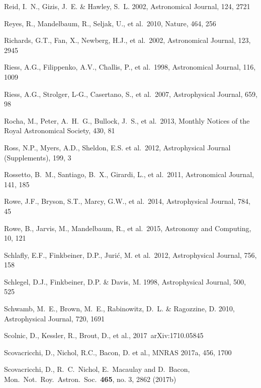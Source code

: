 \documentclass[twocolumn]{aastex61}
\begin{document}
\begin{thebibliography}{}
 Reid, I.~N., Gizis, J.~E. \& Hawley, S.~L. 2002,  Astronomical Journal, 124, 2721

 Reyes, R., Mandelbaum, R., Seljak, U., et al.~2010, Nature, 464, 256

 Richards, G.T., Fan, X., Newberg, H.J., et al.~2002, Astronomical Journal, 123, 2945

 Riess, A.G., Filippenko, A.V., Challis, P., et al.~1998, Astronomical Journal, 116, 1009

 Riess, A.G., Strolger, L-G., Casertano, S., et al.~2007, Astrophysical Journal, 659, 98

 Rocha, M., Peter, A.~H.~G., Bullock, J.~S., et al.\ 2013, Monthly Notices of the Royal Astronomical Society, 430, 81

 Ross, N.P., Myers, A.D., Sheldon, E.S. et al.~2012, Astrophysical Journal (Supplements), 199, 3

 Rossetto, B.~M., Santiago, B.~X., Girardi, L., et al.~2011, Astronomical Journal, 141, 185

 Rowe, J.F., Bryson, S.T., Marcy, G.W., et al.~2014, Astrophysical Journal, 784, 45

 Rowe, B., Jarvis, M., Mandelbaum, R., et al.~2015, Astronomy and Computing,  10, 121

 Schlafly, E.F., Finkbeiner, D.P., Juri\'c, M. et al.~2012, Astrophysical Journal, 756, 158

 Schlegel, D.J., Finkbeiner, D.P. \& Davis, M. 1998, Astrophysical Journal, 500, 525

 Schwamb, M.~E., Brown, M.~E., Rabinowitz, D.~L. \& Ragozzine, D. 2010, Astrophysical Journal, 720, 1691

 Scolnic, D., Kessler, R., Brout, D., et al., 2017~arXiv:1710.05845

 Scovacricchi, D., Nichol, R.C., Bacon, D. et al., MNRAS 2017a, 456, 1700

 Scovacricchi, D., R.~C.~Nichol, E.~Macaulay and D.~Bacon, Mon.\ Not.\ Roy.\ Astron.\ Soc.\  {\bf 465}, no. 3, 2862 (2017b)


\end{thebibliography}
\end{document}
